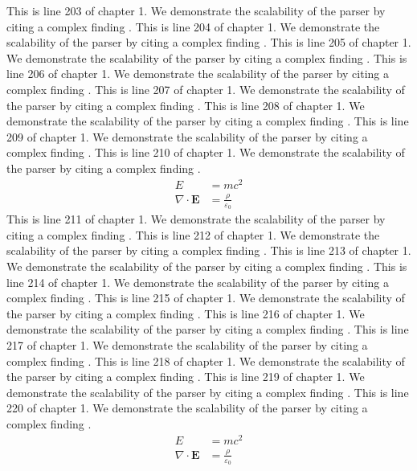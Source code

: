 This is line 203 of chapter 1. We demonstrate the scalability of the parser by citing a complex finding \cite{ref1_203}.
This is line 204 of chapter 1. We demonstrate the scalability of the parser by citing a complex finding \cite{ref1_204}.
This is line 205 of chapter 1. We demonstrate the scalability of the parser by citing a complex finding \cite{ref1_205}.
This is line 206 of chapter 1. We demonstrate the scalability of the parser by citing a complex finding \cite{ref1_206}.
This is line 207 of chapter 1. We demonstrate the scalability of the parser by citing a complex finding \cite{ref1_207}.
This is line 208 of chapter 1. We demonstrate the scalability of the parser by citing a complex finding \cite{ref1_208}.
This is line 209 of chapter 1. We demonstrate the scalability of the parser by citing a complex finding \cite{ref1_209}.
This is line 210 of chapter 1. We demonstrate the scalability of the parser by citing a complex finding \cite{ref1_210}.
\begin{align*}
  E &= mc^2 \\
  \nabla \cdot \mathbf{E} &= \frac{\rho}{\varepsilon_0}
\end{align*}
This is line 211 of chapter 1. We demonstrate the scalability of the parser by citing a complex finding \cite{ref1_211}.
This is line 212 of chapter 1. We demonstrate the scalability of the parser by citing a complex finding \cite{ref1_212}.
This is line 213 of chapter 1. We demonstrate the scalability of the parser by citing a complex finding \cite{ref1_213}.
This is line 214 of chapter 1. We demonstrate the scalability of the parser by citing a complex finding \cite{ref1_214}.
This is line 215 of chapter 1. We demonstrate the scalability of the parser by citing a complex finding \cite{ref1_215}.
This is line 216 of chapter 1. We demonstrate the scalability of the parser by citing a complex finding \cite{ref1_216}.
This is line 217 of chapter 1. We demonstrate the scalability of the parser by citing a complex finding \cite{ref1_217}.
This is line 218 of chapter 1. We demonstrate the scalability of the parser by citing a complex finding \cite{ref1_218}.
This is line 219 of chapter 1. We demonstrate the scalability of the parser by citing a complex finding \cite{ref1_219}.
This is line 220 of chapter 1. We demonstrate the scalability of the parser by citing a complex finding \cite{ref1_220}.
\begin{align*}
  E &= mc^2 \\
  \nabla \cdot \mathbf{E} &= \frac{\rho}{\varepsilon_0}
\end{align*}
